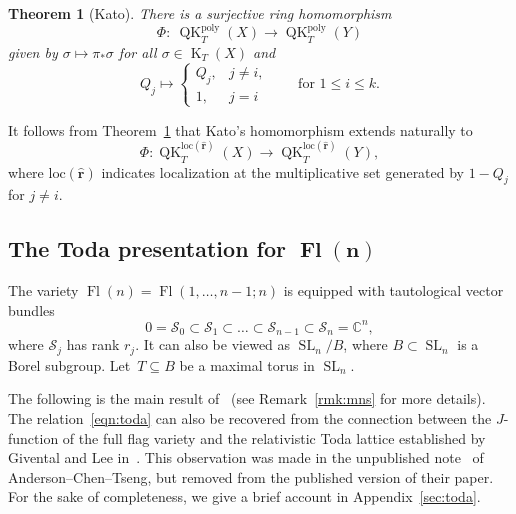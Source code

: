 \documentclass[pdftex]{sigma}
\numberwithin{equation}{section}
\newtheorem{Theorem}{Theorem}[section]
\theoremstyle{definition}
\DeclareMathOperator{\SL}{SL}
\DeclareMathOperator{\Fl}{Fl}
\DeclareMathOperator{\QK}{QK}
\DeclareMathOperator{\K}{K}
\def\poly{{\mathrm{poly}}}
\def\loc{{\mathrm{loc}}}
\newcommand{\C}{{\mathbb C}}
\newcommand{\cS}{{\mathcal S}}
\begin{document}
\begin{Theorem}[Kato]\label{thm:kato-morphism}
 There is a surjective ring homomorphism
 \[
 \Phi\colon\ \QK^\poly_T(X)\to\QK^\poly_T(Y)
 \]
 given by $\sigma\mapsto{\pi}_*\sigma$ for all $\sigma\in\K_T(X)$ and
 \[
 Q_j\mapsto\begin{cases}
 Q_j, & j\neq i,\\
 1, & j=i
 \end{cases} \qquad \text{for $1\leq i\leq k$}.\]
\end{Theorem}
It follows from Theorem~\ref{thm:kato-morphism} that
Kato's homomorphism extends naturally to
\begin{equation}\label{E:Kato-loc-hom}
\Phi\colon \QK_T^{\loc(\mathbf{\hat r})}(X) \to
\QK_T^{\loc(\mathbf{\hat r})}(Y) ,
\end{equation}
where $\loc(\mathbf{\hat r})$ indicates localization at the multiplicative set generated by
$1- Q_j$ for $j \neq i$.

\subsection[The Toda presentation for Fl(n)]{The Toda presentation for $\boldsymbol{\Fl(n)}$}

The variety $\Fl(n)=\Fl(1,\dots,n-1;n)$ is equipped with tautological vector bundles
\[
 0=\cS_{0}\subset\cS_{1}\subset\dots \subset \cS_{n-1}\subset \cS_{n}=\C^n ,
\]
where $\cS_j$ has rank $r_j$. It can also be viewed as $\SL_n/B$, where $B\subset \SL_n$ is a Borel subgroup. Let~${T\subseteq B}$ be a maximal torus in $\SL_n$.

The following is the main result of~\cite{maeno.naito.sagaki:QKideal} (see Remark~\ref{rmk:mns} for more details). The relation~\eqref{eqn:toda} can also be recovered from the connection between the $J$-function of the full flag variety and the relativistic Toda lattice established by Givental and Lee in~\cite{givental_lee}. This observation was made in the unpublished note~\cite{act:2017} of Anderson--Chen--Tseng, but removed from the published version of their paper. For the sake of completeness, we give a brief account in Appendix~\ref{sec:toda}.
\end{document}
